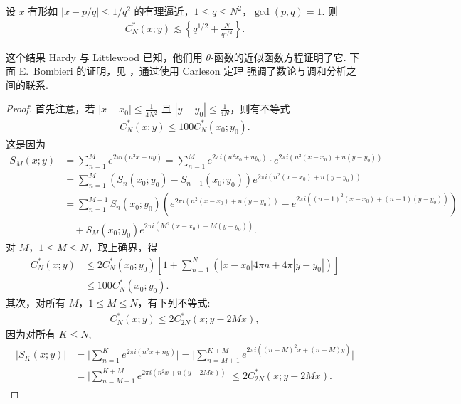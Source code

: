 \begin{lemma}\label{lem:8.9}
设 $x$ 有形如 $|x - p/q| \leq 1/q^2$ 的有理逼近，$1 \leq q \leq N^2$，$\gcd(p, q) = 1$. 则
\begin{align*}
  C_{N}^{*}(x;y)\lesssim\left\{q^{1/2}+\frac{N}{q^{1/2}}\right\}.
\end{align*}
\end{lemma}

这个结果 Hardy 与 Littlewood \cite{b187,b188} 已知，他们用 $\theta$-函数的近似函数方程证明了它. 下面 E.~Bombieri 的证明，见 \cite{b173}，通过使用 Carleson 定理 \cite{b175} 强调了数论与调和分析之间的联系.

\begin{proof}
首先注意，若 $|x - x_0| \leq \frac{1}{4N^2}$ 且 $|y - y_0| \leq \frac{1}{4N}$，则有不等式
\begin{align*}
  C_{N}^{*}(x;y)\leq 100C_{N}^{*}(x_{0};y_{0}).
\end{align*}
这是因为
\begin{align*}
  S_{M}(x;y)
  &=\sum_{n=1}^{M}e^{2\pi i(n^{2}x+ny)}
  =\sum_{n=1}^{M}e^{2\pi i(n^{2}x_{0}+ny_{0})}\cdot e^{2\pi i(n^{2}(x-x_{0})+n(y-y_{0}))}\\
  &=\sum_{n=1}^{M}\left(S_{n}(x_{0};y_{0})-S_{n-1}(x_{0};y_{0})\right)e^{2\pi i(n^{2}(x-x_{0})+n(y-y_{0}))}\\
  &=\sum_{n=1}^{M-1}S_{n}(x_{0};y_{0})\left(e^{2\pi i(n^{2}(x-x_{0})+n(y-y_{0}))}
   -e^{2\pi i((n+1)^{2}(x-x_{0})+(n+1)(y-y_{0}))}\right)\\
  &\quad+S_{M}(x_{0};y_{0})e^{2\pi i(M^{2}(x-x_{0})+M(y-y_{0}))}.
\end{align*}
对 $M$，$1 \leq M \leq N$，取上确界，得
\begin{align*}
  C_{N}^{*}(x;y)
  &\leq 2C_{N}^{*}(x_{0};y_{0})\left[1+\sum_{n=1}^{N}(|x-x_{0}|4\pi n+4\pi|y-y_{0}|)\right]\\
  &\leq 100C_{N}^{*}(x_{0};y_{0}).
\end{align*}
其次，对所有 $M$，$1 \leq M \leq N$，有下列不等式:
\begin{align*}
  C_{N}^{*}(x;y)\leq 2C_{2N}^{*}(x;y-2Mx),
\end{align*}
因为对所有 $K \leq N$,
\begin{align*}
  \left|S_{K}(x;y)\right|
  &=\Big|\sum_{n=1}^{K}e^{2\pi i(n^{2}x+ny)}\Big|
  =\Big|\sum_{n=M+1}^{K+M}e^{2\pi i((n-M)^{2}x+(n-M)y)}\Big|\\
  &=\Big|\sum_{n=M+1}^{K+M}e^{2\pi i(n^{2}x+n(y-2Mx))}\Big|
  \leq 2C_{2N}^{*}(x;y-2Mx).
\end{align*}

\end{proof}
